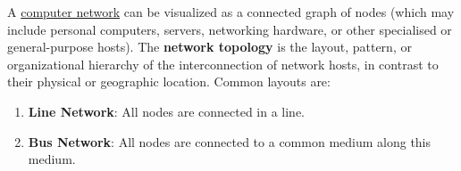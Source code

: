 \documentclass{article}
\begin{document}
  A \hyperref[def:computer-network]{computer network} can be visualized as a connected graph of nodes (which may include personal computers, servers, networking hardware, or other specialised or general-purpose hosts). The \textbf{network topology} is the layout, pattern, or organizational hierarchy of the interconnection of network hosts, in contrast to their physical or geographic location. Common layouts are: 
  \begin{enumerate}
      \item \textbf{Line Network}: All nodes are connected in a line. 
  \begin{center}
  \end{center}
      \item \textbf{Bus Network}: All nodes are connected to a common medium along this medium. 


\end{enumerate}
\end{document}
